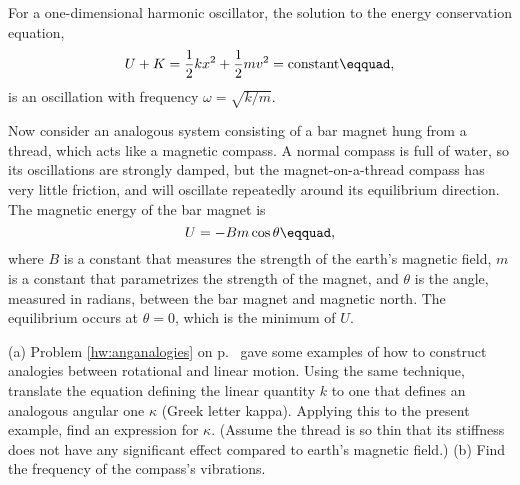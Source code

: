 For a one-dimensional harmonic oscillator, the solution to the
energy conservation equation,
\begin{equation*}
        U+K = \frac{1}{2}kx^2+\frac{1}{2}mv^2 = \text{constant}\eqquad,
\end{equation*}
is an oscillation with frequency $\omega=\sqrt{k/m}$.  

\noindent Now consider an analogous system consisting of a bar magnet hung from a thread,
which acts like a magnetic compass. A normal
compass is full of water, so its oscillations are strongly damped, but the
magnet-on-a-thread compass has very little friction, and will oscillate repeatedly
around its equilibrium direction. The magnetic energy of the bar magnet
is
\begin{equation*}
        U = -Bm\cos\theta\eqquad,
\end{equation*}
where $B$ is a constant that measures the strength of the earth's magnetic field,
$m$ is a constant that parametrizes the strength of the magnet, and
$\theta$ is the angle, measured in radians, 
between the bar magnet and magnetic north. The equilibrium
occurs at $\theta=0$, which is the minimum of $U$.

\noindent (a) Problem \ref{hw:anganalogies} on p.~\pageref{hw:anganalogies} gave some examples of how to construct
analogies between rotational and linear motion. 
Using the same technique, translate the
equation defining the linear quantity $k$ to one that defines an analogous angular
one $\kappa$ (Greek letter kappa). Applying this to the present example, find an
expression for $\kappa$.
(Assume the thread is so thin that its stiffness does not have any significant
effect compared to earth's magnetic field.)\hwendpart
(b) Find the frequency of the compass's vibrations.
